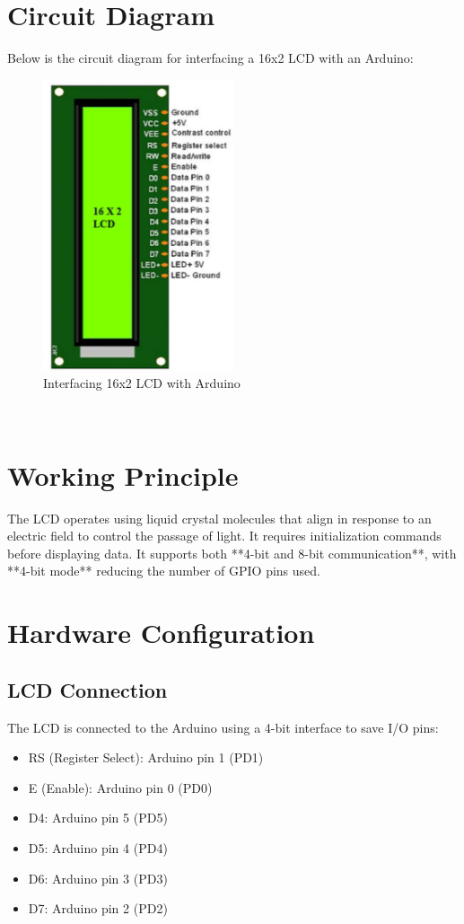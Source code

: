 \documentclass[12pt,a4paper]{article}
\begin{document}
\section{Circuit Diagram}
Below is the circuit diagram for interfacing a 16x2 LCD with an Arduino:\\

\begin{figure}[h]
    \centering
    \includegraphics[width=0.5\textwidth]{LCD display.png} %
    \caption{Interfacing 16x2 LCD with Arduino}
    \label{fig:lcd_circuit}
\end{figure}\\

\section{Working Principle}
The LCD operates using liquid crystal molecules that align in response to an electric field to control the passage of light. It requires initialization commands before displaying data. It supports both **4-bit and 8-bit communication**, with **4-bit mode** reducing the number of GPIO pins used.
\section{Hardware Configuration}
\subsection{LCD Connection}
The LCD is connected to the Arduino using a 4-bit interface to save I/O pins:
\begin{itemize}
    \item RS (Register Select): Arduino pin 1 (PD1)
    \item E (Enable): Arduino pin 0 (PD0)
    \item D4: Arduino pin 5 (PD5)
    \item D5: Arduino pin 4 (PD4)
    \item D6: Arduino pin 3 (PD3)
    \item D7: Arduino pin 2 (PD2)
\end{itemize}
\end{document}
